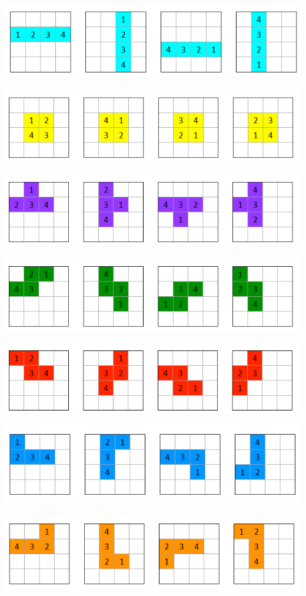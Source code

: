 \documentclass[a4paper]{article}
\begin{document}
	\begin{center}


	\includegraphics[scale=0.7]{resources/img/orientations/cyan}
	\label{img:cyan}

	\includegraphics[scale=0.7]{resources/img/orientations/yellow}
	\label{img:yellow}

	\includegraphics[scale=0.7]{resources/img/orientations/purple}
	\label{img:purple}

	\includegraphics[scale=0.7]{resources/img/orientations/green}
	\label{img:green}

	\includegraphics[scale=0.7]{resources/img/orientations/red}
	\label{img:red}

	\includegraphics[scale=0.7]{resources/img/orientations/blue}
	\label{img:blue}

	\includegraphics[scale=0.7]{resources/img/orientations/orange}
	\label{img:orange}
	
	\end{center}
	
\end{document}
